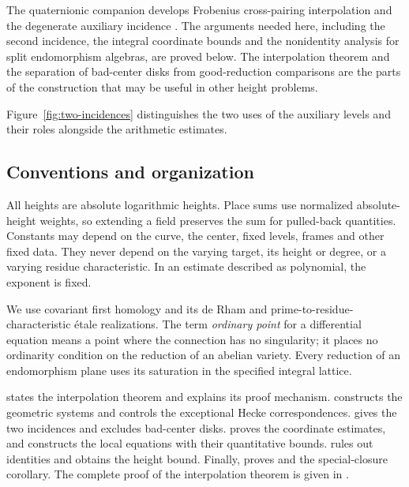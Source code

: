 The quaternionic companion develops Frobenius cross-pairing
interpolation and the degenerate auxiliary incidence
\cite[Sections~2--5]{CompanionQuaternion}. The arguments needed here, including
the second incidence, the integral coordinate bounds and the
nonidentity analysis for split endomorphism algebras, are proved below.
The interpolation theorem and the separation of bad-center disks from
good-reduction comparisons are the parts of the construction that may
be useful in other height problems.

Figure~\ref{fig:two-incidences} distinguishes the two uses of the
auxiliary levels and their roles alongside the arithmetic estimates.


\subsection{Conventions and organization}

All heights are absolute logarithmic heights. Place sums use normalized
absolute-height weights, so extending a field preserves the sum for
pulled-back quantities. Constants may depend on the curve, the center,
fixed levels, frames and other fixed data. They never depend on the
varying target, its height or degree, or a varying residue characteristic.
In an estimate described as polynomial, the exponent is fixed.

We use covariant first homology and its de Rham and prime-to-residue-
characteristic \'etale realizations. The term \emph{ordinary point} for a
differential equation means a point where the connection has no
singularity; it places no ordinarity condition on the reduction of an
abelian variety. Every reduction of an endomorphism plane uses its
saturation in the specified integral lattice.

 states the interpolation theorem and explains its
proof mechanism.
 constructs the geometric systems and controls the
exceptional Hecke correspondences.  gives the two
incidences and excludes bad-center disks.  proves the
coordinate estimates, and  constructs the local
equations with their quantitative bounds.  rules out
identities and obtains the height bound. Finally,
 proves  and the
special-closure corollary. The complete proof of the interpolation
theorem is given in .
